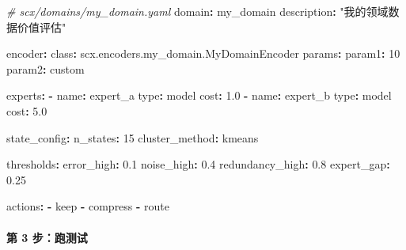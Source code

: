 \documentclass[
  12pt,
]{ctexart}
\newenvironment{Shaded}{}{}
\newcommand{\AttributeTok}[1]{\textcolor[rgb]{0.49,0.56,0.16}{#1}}
\newcommand{\CommentTok}[1]{\textcolor[rgb]{0.38,0.63,0.69}{\textit{#1}}}
\newcommand{\DecValTok}[1]{\textcolor[rgb]{0.25,0.63,0.44}{#1}}
\newcommand{\FloatTok}[1]{\textcolor[rgb]{0.25,0.63,0.44}{#1}}
\newcommand{\FunctionTok}[1]{\textcolor[rgb]{0.02,0.16,0.49}{#1}}
\newcommand{\KeywordTok}[1]{\textcolor[rgb]{0.00,0.44,0.13}{\textbf{#1}}}
\newcommand{\StringTok}[1]{\textcolor[rgb]{0.25,0.44,0.63}{#1}}
\begin{document}
\begin{Shaded}
\begin{Highlighting}[]
\CommentTok{\# scx/domains/my\_domain.yaml}
\FunctionTok{domain}\KeywordTok{:}\AttributeTok{ my\_domain}
\FunctionTok{description}\KeywordTok{:}\AttributeTok{ }\StringTok{"我的领域数据价值评估"}

\FunctionTok{encoder}\KeywordTok{:}
\AttributeTok{  }\FunctionTok{class}\KeywordTok{:}\AttributeTok{ scx.encoders.my\_domain.MyDomainEncoder}
\AttributeTok{  }\FunctionTok{params}\KeywordTok{:}
\AttributeTok{    }\FunctionTok{param1}\KeywordTok{:}\AttributeTok{ }\DecValTok{10}
\AttributeTok{    }\FunctionTok{param2}\KeywordTok{:}\AttributeTok{ custom}

\FunctionTok{experts}\KeywordTok{:}
\AttributeTok{  }\KeywordTok{{-}}\AttributeTok{ }\FunctionTok{name}\KeywordTok{:}\AttributeTok{ expert\_a}
\AttributeTok{    }\FunctionTok{type}\KeywordTok{:}\AttributeTok{ model}
\AttributeTok{    }\FunctionTok{cost}\KeywordTok{:}\AttributeTok{ }\FloatTok{1.0}
\AttributeTok{  }\KeywordTok{{-}}\AttributeTok{ }\FunctionTok{name}\KeywordTok{:}\AttributeTok{ expert\_b}
\AttributeTok{    }\FunctionTok{type}\KeywordTok{:}\AttributeTok{ model}
\AttributeTok{    }\FunctionTok{cost}\KeywordTok{:}\AttributeTok{ }\FloatTok{5.0}

\FunctionTok{state\_config}\KeywordTok{:}
\AttributeTok{  }\FunctionTok{n\_states}\KeywordTok{:}\AttributeTok{ }\DecValTok{15}
\AttributeTok{  }\FunctionTok{cluster\_method}\KeywordTok{:}\AttributeTok{ kmeans}

\FunctionTok{thresholds}\KeywordTok{:}
\AttributeTok{  }\FunctionTok{error\_high}\KeywordTok{:}\AttributeTok{ }\FloatTok{0.1}
\AttributeTok{  }\FunctionTok{noise\_high}\KeywordTok{:}\AttributeTok{ }\FloatTok{0.4}
\AttributeTok{  }\FunctionTok{redundancy\_high}\KeywordTok{:}\AttributeTok{ }\FloatTok{0.8}
\AttributeTok{  }\FunctionTok{expert\_gap}\KeywordTok{:}\AttributeTok{ }\FloatTok{0.25}

\FunctionTok{actions}\KeywordTok{:}
\AttributeTok{  }\KeywordTok{{-}}\AttributeTok{ keep}
\AttributeTok{  }\KeywordTok{{-}}\AttributeTok{ compress}
\AttributeTok{  }\KeywordTok{{-}}\AttributeTok{ route}
\end{Highlighting}
\end{Shaded}

\paragraph{第 3 步：跑测试}\label{ux7b2c-3-ux6b65ux8dd1ux6d4bux8bd5}
\end{document}
